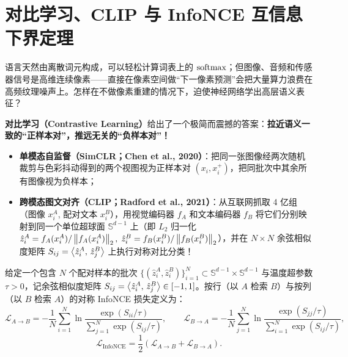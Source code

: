 \section{对比学习、CLIP 与 InfoNCE 互信息下界定理}
\label{sec:contrastive-infonce}

语言天然由离散词元构成，可以轻松计算词表上的 $\operatorname{softmax}$；但图像、音频和传感器信号是高维连续像素——直接在像素空间做“下一像素预测”会把大量算力浪费在高频纹理噪声上。怎样在不做像素重建的情况下，迫使神经网络学出高层语义表征？

\textbf{对比学习（Contrastive Learning）}给出了一个极简而震撼的答案：\textbf{拉近语义一致的“正样本对”，推远无关的“负样本对”！}
\begin{itemize}
  \item \textbf{单模态自监督（SimCLR；Chen et al., 2020）}：把同一张图像经两次随机裁剪与色彩抖动得到的两个视图视为正样本对 $(x_i, x_i^+)$，把同批次中其余所有图像视为负样本；
  \item \textbf{跨模态图文对齐（CLIP；Radford et al., 2021）}：从互联网抓取 4 亿组（图像 $x_i^A$, 配对文本 $x_i^B$），用视觉编码器 $f_A$ 和文本编码器 $f_B$ 将它们分别映射到同一个单位超球面 $\mathbb{S}^{d-1}$ 上（即 $L_2$ 归一化 $\hat{z}_i^A = f_A(x_i^A)/\left\|f_A(x_i^A)\right\|_2,\; \hat{z}_i^B = f_B(x_i^B)/\left\|f_B(x_i^B)\right\|_2$），并在 $N \times N$ 余弦相似度矩阵 $S_{ij} = \left\langle \hat{z}_i^A,\, \hat{z}_j^B \right\rangle$ 上执行对称对比分类！
\end{itemize}

\begin{defBox}
\begin{definition}
给定一个包含 $N$ 个配对样本的批次 $\{(\hat{z}_i^A, \hat{z}_i^B)\}_{i=1}^N \subset \mathbb{S}^{d-1} \times \mathbb{S}^{d-1}$ 与温度超参数 $\tau > 0$，记余弦相似度矩阵 $S_{ij} = \left\langle \hat{z}_i^A,\, \hat{z}_j^B \right\rangle \in [-1, 1]$。按行（以 $A$ 检索 $B$）与按列（以 $B$ 检索 $A$）的对称 InfoNCE 损失定义为：
\begin{equation}
  \mathcal{L}_{A \to B} = -\frac{1}{N}\sum_{i=1}^{N} \ln \frac{\exp(S_{ii}/\tau)}{\sum_{j=1}^{N} \exp(S_{ij}/\tau)},
  \qquad
  \mathcal{L}_{B \to A} = -\frac{1}{N}\sum_{j=1}^{N} \ln \frac{\exp(S_{jj}/\tau)}{\sum_{i=1}^{N} \exp(S_{ij}/\tau)},
  \label{eq:infonce-dir}
\end{equation}
\begin{equation}
  \mathcal{L}_{\mathrm{InfoNCE}} = \frac{1}{2}\left(\mathcal{L}_{A \to B} + \mathcal{L}_{B \to A}\right).
  \label{eq:infonce-sym}
\end{equation}
\end{definition}
\end{defBox}


